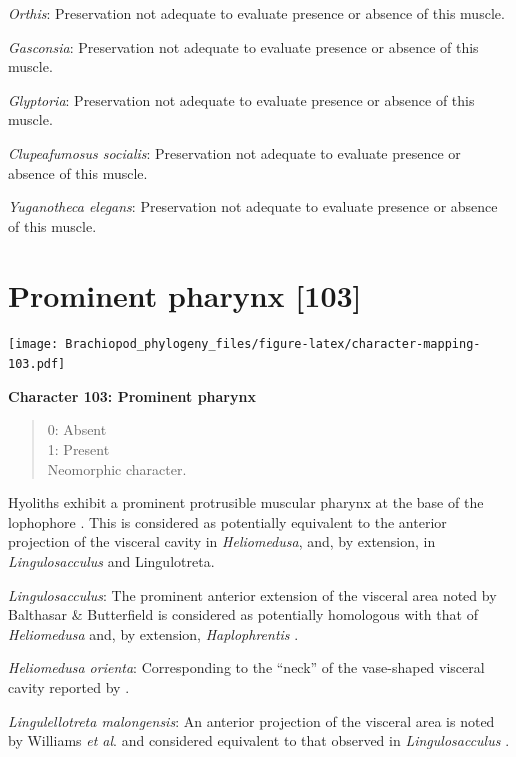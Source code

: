 \documentclass[openany]{book}
\theoremstyle{definition}
\theoremstyle{definition}
\theoremstyle{definition}
\theoremstyle{remark}
\begin{document}
\emph{Orthis}: Preservation not adequate to evaluate presence or absence
of this muscle.

\emph{Gasconsia}: Preservation not adequate to evaluate presence or
absence of this muscle.

\emph{Glyptoria}: Preservation not adequate to evaluate presence or
absence of this muscle.

\emph{Clupeafumosus socialis}: Preservation not adequate to evaluate
presence or absence of this muscle.

\emph{Yuganotheca elegans}: Preservation not adequate to evaluate
presence or absence of this muscle.

\hypertarget{prominent-pharynx-103}{%
\section{Prominent pharynx {[}103{]}}\label{prominent-pharynx-103}}

\texttt{[image: Brachiopod\_phylogeny\_files/figure-latex/character-mapping-103.pdf]}

\textbf{Character 103: Prominent pharynx}

\begin{quote}
0: Absent\\
1: Present\\
Neomorphic character.
\end{quote}

Hyoliths exhibit a prominent protrusible muscular pharynx at the base of
the lophophore \citep{Moysiuk2017Hyolithsare}. This is considered as
potentially equivalent to the anterior projection of the visceral cavity
in \emph{Heliomedusa}, and, by extension, in \emph{Lingulosacculus} and
Lingulotreta.

\emph{Lingulosacculus}: The prominent anterior extension of the visceral
area noted by Balthasar \& Butterfield
\citeyearpar{Balthasar2009EarlyCambrian} is considered as potentially
homologous with that of \emph{Heliomedusa}
\citep{Zhang2009Architectureand} and, by extension, \emph{Haplophrentis}
\citep{Moysiuk2017Hyolithsare}.

\emph{Heliomedusa orienta}: Corresponding to the ``neck'' of the
vase-shaped visceral cavity reported by
\citet{Zhang2009Architectureand}.

\emph{Lingulellotreta malongensis}: An anterior projection of the
visceral area is noted by Williams \emph{et al}.
\citeyearpar{Williams2000BrachiopodaLinguliformea} and considered
equivalent to that observed in \emph{Lingulosacculus}
\citep{Balthasar2009EarlyCambrian}.
\end{document}
